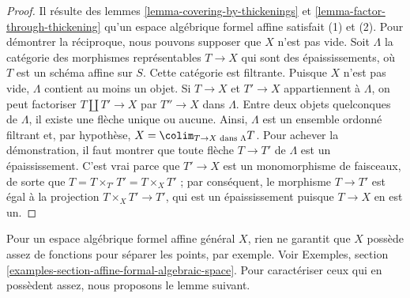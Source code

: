 \begin{proof}
Il résulte des lemmes \ref{lemma-covering-by-thickenings} et
\ref{lemma-factor-through-thickening} qu'un espace algébrique formel affine
satisfait (1) et (2). Pour démontrer la réciproque, nous pouvons
supposer que $X$ n'est pas vide.
Soit $\Lambda$ la catégorie des morphismes représentables $T \to X$ qui sont des
épaississements, où $T$ est un schéma affine sur $S$. Cette catégorie
est filtrante. Puisque $X$ n'est pas vide, $\Lambda$ contient au moins un
objet. Si $T \to X$ et $T' \to X$ appartiennent à $\Lambda$, on peut
factoriser $T \amalg T' \to X$ par $T'' \to X$ dans $\Lambda$. Entre
deux objets quelconques de $\Lambda$, il existe une flèche unique ou aucune. Ainsi,
$\Lambda$ est un ensemble ordonné filtrant et, par hypothèse,
$X = \colim_{T \to X\text{ dans }\Lambda} T$. Pour achever la démonstration,
il faut montrer que toute flèche $T \to T'$ de $\Lambda$ est un épaississement.
C'est vrai parce que $T' \to X$ est un monomorphisme de faisceaux, de sorte que
$T = T \times_{T'} T' = T \times_X T'$ ; par conséquent, le morphisme
$T \to T'$ est égal à la projection $T \times_X T' \to T'$, qui est
un épaississement puisque $T \to X$ en est un.
\end{proof}

\noindent
Pour un espace algébrique formel affine général $X$, rien ne garantit
que $X$ possède assez de fonctions pour séparer les points, par exemple.
Voir Exemples, section \ref{examples-section-affine-formal-algebraic-space}.
Pour caractériser ceux qui en possèdent assez, nous proposons le lemme suivant.

